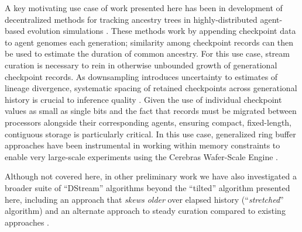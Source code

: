 A key motivating use case of work presented here has been in development of decentralized methods for tracking ancestry trees in highly-distributed agent-based evolution simulations \citep{moreno2022hereditary}.
These methods work by appending checkpoint data to agent genomes each generation;
similarity among checkpoint records can then be used to estimate the duration of common ancestry.
For this use case, stream curation is necessary to rein in otherwise unbounded growth of generational checkpoint records.
As downsampling introduces uncertainty to estimates of lineage divergence, systematic spacing of retained checkpoints across generational history is crucial to inference quality \citep{moreno2024guide}.
Given the use of individual checkpoint values as small as single bits and the fact that records must be migrated between processors alongside their corresponding agents, ensuring compact, fixed-length, contiguous storage is particularly critical.
In this use case, generalized ring buffer approaches have been instrumental in working within memory constraints to enable very large-scale experiments using the Cerebras Wafer-Scale Engine \citep{moreno2024trackable}.

Although not covered here, in other preliminary work we have also investigated a broader suite of ``DStream'' algorithms beyond the ``tilted'' algorithm presented here, including an approach that \textit{skews older} over elapsed history (``\textit{stretched}'' algorithm) and an alternate approach to steady curation compared to existing approaches \citep{moreno2024structured}.
